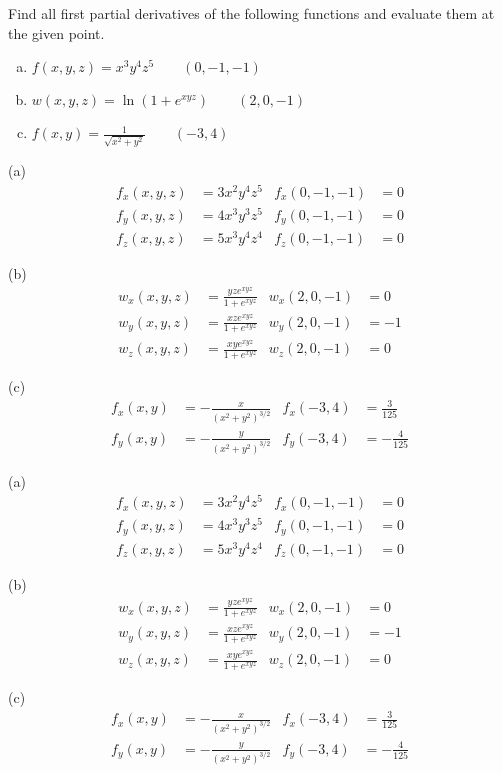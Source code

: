 \begin{question}
Find all first partial derivatives of the following functions 
and evaluate them at the given point.
\begin{enumerate}[(a)]
\item
$f(x,y,z)=x^3y^4z^5\qquad (0,-1,-1)$
\item
$w(x,y,z)=\ln\left(1+e^{xyz}\right)\qquad (2,0,-1)$
\item
$f(x,y)=\frac{1}{\sqrt{x^2+y^2}}\qquad (-3,4)$
\end{enumerate}
\end{question}

%

\begin{answer}
(a)
\begin{align*}
f_x(x,y,z)&=3x^2y^4z^5 & f_x(0,-1,-1)&=0\\ 
f_y(x,y,z)&=4x^3y^3z^5 & f_y(0,-1,-1)&=0\\
f_z(x,y,z)&=5x^3y^4z^4 & f_z(0,-1,-1)&=0
\end{align*}

(b)
\begin{align*}
w_x(x,y,z)&=\frac{yz e^{xyz}}{1+e^{xyz}} & w_x(2,0,-1)&=0\\
w_y(x,y,z)&=\frac{xz e^{xyz}}{1+e^{xyz}} & w_y(2,0,-1)&=-1\\
w_z(x,y,z)&=\frac{xy e^{xyz}}{1+e^{xyz}} & w_z(2,0,-1)&=0
\end{align*}

(c)
\begin{align*}
f_x(x,y)&=-\frac{x}{(x^2+y^2)^{3/2}} & f_x(-3,4)&=\frac{3}{125}\\
f_y(x,y)&=-\frac{y}{(x^2+y^2)^{3/2}} & f_y(-3,4)&=-\frac{4}{125} 
\end{align*}
\end{answer}

\begin{solution}
(a)
\begin{align*}
f_x(x,y,z)&=3x^2y^4z^5 & f_x(0,-1,-1)&=0\\ 
f_y(x,y,z)&=4x^3y^3z^5 & f_y(0,-1,-1)&=0\\
f_z(x,y,z)&=5x^3y^4z^4 & f_z(0,-1,-1)&=0
\end{align*}

(b)
\begin{align*}
w_x(x,y,z)&=\frac{yz e^{xyz}}{1+e^{xyz}} & w_x(2,0,-1)&=0\\
w_y(x,y,z)&=\frac{xz e^{xyz}}{1+e^{xyz}} & w_y(2,0,-1)&=-1\\
w_z(x,y,z)&=\frac{xy e^{xyz}}{1+e^{xyz}} & w_z(2,0,-1)&=0
\end{align*}

(c)
\begin{align*}
f_x(x,y)&=-\frac{x}{(x^2+y^2)^{3/2}} & f_x(-3,4)&=\frac{3}{125}\\
f_y(x,y)&=-\frac{y}{(x^2+y^2)^{3/2}} & f_y(-3,4)&=-\frac{4}{125} 
\end{align*}

\end{solution}



